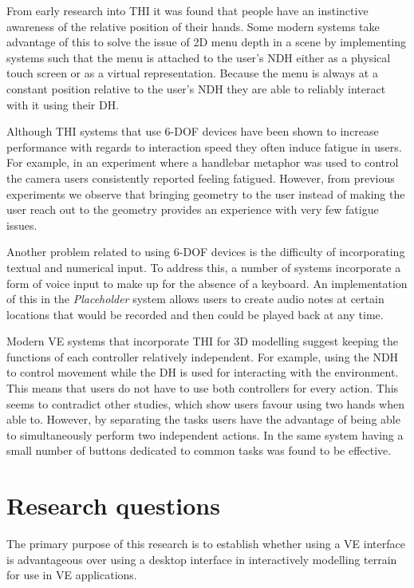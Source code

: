 \documentclass{sig-alternate-05-2015}
\begin{document}
From early research into THI it was found that people have an instinctive awareness of the relative position of their hands\cite{Bowman1998, Buxton1986}. Some modern systems take advantage of this to solve the issue of 2D menu depth in a scene by implementing systems such that the menu is attached to the user's NDH either as a physical touch screen\cite{Wang2013,Mine2014} or as a virtual representation\cite{Jerald2013}. Because the menu is always at a constant position relative to the user's NDH they are able to reliably interact with it using their DH.

Although THI systems that use 6-DOF devices have been shown to increase performance with regards to interaction speed\cite{Schultheis2012} they often induce fatigue in users. For example, in an experiment where a handlebar metaphor was used to control the camera users consistently reported feeling fatigued\cite{Song2012}. However, from previous experiments we observe that bringing geometry to the user instead of making the user reach out to the geometry provides an experience with very few fatigue issues\cite{Jerald2013}.

Another problem related to using 6-DOF devices is the difficulty of incorporating textual and numerical input. To address this, a number of systems incorporate a form of voice input to make up for the absence of a keyboard\cite{Ponto2013,Toma2012}. An implementation of this in the \textit{Placeholder} system\cite{Laurel1994} allows users to create audio notes at certain locations that would be recorded and then could be played back at any time.

Modern VE systems that incorporate THI for 3D modelling suggest keeping the functions of each controller relatively independent\cite{Mine2014}. For example, using the NDH to control movement while the DH is used for interacting with the environment. This means that users do not have to use both controllers for every action. This seems to contradict other studies, which show users favour using two hands when able to\cite{Buxton1986,Hinckley1994}. However, by separating the tasks  users have the advantage of being able to simultaneously perform two independent actions.  In the same system having a small number of buttons dedicated to common tasks was found to be effective\cite{Mine2014}.


\section{Research questions}
The primary purpose of this research is to establish whether using a VE interface is advantageous over using a desktop interface in interactively modelling terrain for use in VE applications.
\end{document}

